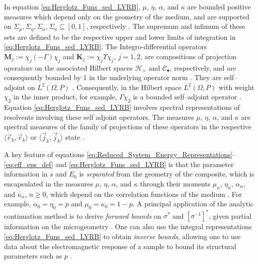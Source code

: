 \documentclass[english,12pt,jmp,graphicx]{revtex4-1}
\begin{document}
In equation \eqref{eq:Herglotz_Funs_sed_LYRB}, $\mu$, $\eta$, $\alpha$, and $\kappa$ 
are bounded positive measures which depend only on the geometry of the
medium, and are supported on $\Sigma_\mu,\Sigma_\eta,\Sigma_\alpha,\Sigma_\kappa\subseteq[0,1]$, respectively
\cite{Golden:CMP-473,Bergman:AP-78}. The supremum and infimum of these
sets are defined to be the respective upper and lower limits of
integration in \eqref{eq:Herglotz_Funs_sed_LYRB}. 
%
%
%
The Integro-differential operators $\mathbf{M}_j:=\chi_j(-\Gamma)\chi_j$ and
$\mathbf{K}_j:=\chi_j\Upsilon\chi_j$, $j=1,2$, are compositions of projection
operators on the associated Hilbert spaces $\mathscr{H}_\times$ and
$\mathscr{C}_\bullet$, respectively, and are consequently bounded by 1 in the underlying
operator norm \cite{Rudin:87,Folland:95}. They are self--adjoint on
$L^2(\Omega,P)$ \cite{Golden:CMP-473}. Consequently, in the Hilbert space $L^2(\Omega,P)$
with weight $\chi_2$ in the inner product, for example, $\Gamma\chi_2$ is a 
bounded self--adjoint operator \cite{Golden:CMP-473}. Equation
\eqref{eq:Herglotz_Funs_sed_LYRB} involves spectral representations of
resolvents involving these self adjoint operators. The measures $\mu$,
$\eta$, $\alpha$, and $\kappa$ are spectral measures of the family of projections
of these operators in the respective $\langle\vec{e}_k,\vec{e}_k\rangle$ or
$\langle\vec{j}_k,\vec{j}_k\rangle$ state \cite{Golden:CMP-473,Reed-1980}.   

A key feature of equations
\eqref{eq:Reduced_System_Energy_Representations}--\eqref{eq:eff_eps_def} and
\eqref{eq:Herglotz_Funs_sed_LYRB} is 
that the parameter information in $s$ and $E_0$ is {\it separated}
from the geometry of the composite, which is encapsulated in the 
measures $\mu$, $\eta$, $\alpha$, and $\kappa$ through their moments $\mu_n$, $\eta_n$,
$\alpha_n$, and $\kappa_n$, $n\geq0$, which depend on the correlation functions of the
medium \cite{Golden:CMP-473}. For example, $\alpha_0=\eta_0=p$ and
$\mu_0=\kappa_0=1-p$. A principal application of the analytic continuation
method is to derive \emph{forward bounds} on $\sigma^*$ and $[\sigma^{-1}]^*$, given partial
information on the microgeometry
\cite{Bergman:PRL-1285,Milton:APL-300,Golden:CMP-473,Bergman:AP-78}. One
can also use the integral representations
\eqref{eq:Herglotz_Funs_sed_LYRB} to obtain \emph{inverse bounds},
allowing one to use data about the electromagnetic response of a
sample to bound its structural parameters such as $p$ \cite{Golden:JoB:337}.
\end{document}
